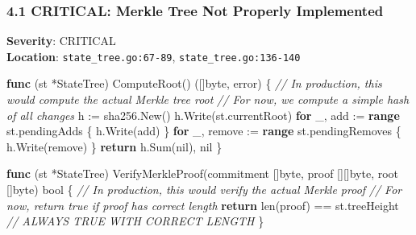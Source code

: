 \documentclass[
]{article}
\newenvironment{Shaded}{}{}
\newcommand{\BuiltInTok}[1]{\textcolor[rgb]{0.00,0.50,0.00}{#1}}
\newcommand{\CommentTok}[1]{\textcolor[rgb]{0.38,0.63,0.69}{\textit{#1}}}
\newcommand{\ControlFlowTok}[1]{\textcolor[rgb]{0.00,0.44,0.13}{\textbf{#1}}}
\newcommand{\DataTypeTok}[1]{\textcolor[rgb]{0.56,0.13,0.00}{#1}}
\newcommand{\KeywordTok}[1]{\textcolor[rgb]{0.00,0.44,0.13}{\textbf{#1}}}
\newcommand{\NormalTok}[1]{#1}
\newcommand{\OperatorTok}[1]{\textcolor[rgb]{0.40,0.40,0.40}{#1}}
\newcommand{\OtherTok}[1]{\textcolor[rgb]{0.00,0.44,0.13}{#1}}
\begin{document}
\subsubsection{4.1 CRITICAL: Merkle Tree Not Properly
Implemented}\label{41-critical-merkle-tree-not-properly-implemented}

\textbf{Severity}: CRITICAL\\
\textbf{Location}: \texttt{state\_tree.go:67-89},
\texttt{state\_tree.go:136-140}

\begin{Shaded}
\begin{Highlighting}[]
\KeywordTok{func} \OperatorTok{(}\NormalTok{st }\OperatorTok{*}\NormalTok{StateTree}\OperatorTok{)}\NormalTok{ ComputeRoot}\OperatorTok{()} \OperatorTok{([]}\DataTypeTok{byte}\OperatorTok{,} \DataTypeTok{error}\OperatorTok{)} \OperatorTok{\{}
    \CommentTok{// In production, this would compute the actual Merkle tree root}
    \CommentTok{// For now, we compute a simple hash of all changes}
\NormalTok{    h }\OperatorTok{:=}\NormalTok{ sha256}\OperatorTok{.}\NormalTok{New}\OperatorTok{()}
\NormalTok{    h}\OperatorTok{.}\NormalTok{Write}\OperatorTok{(}\NormalTok{st}\OperatorTok{.}\NormalTok{currentRoot}\OperatorTok{)}
    \ControlFlowTok{for}\NormalTok{ \_}\OperatorTok{,}\NormalTok{ add }\OperatorTok{:=} \KeywordTok{range}\NormalTok{ st}\OperatorTok{.}\NormalTok{pendingAdds }\OperatorTok{\{}
\NormalTok{        h}\OperatorTok{.}\NormalTok{Write}\OperatorTok{(}\NormalTok{add}\OperatorTok{)}
    \OperatorTok{\}}
    \ControlFlowTok{for}\NormalTok{ \_}\OperatorTok{,}\NormalTok{ remove }\OperatorTok{:=} \KeywordTok{range}\NormalTok{ st}\OperatorTok{.}\NormalTok{pendingRemoves }\OperatorTok{\{}
\NormalTok{        h}\OperatorTok{.}\NormalTok{Write}\OperatorTok{(}\NormalTok{remove}\OperatorTok{)}
    \OperatorTok{\}}
    \ControlFlowTok{return}\NormalTok{ h}\OperatorTok{.}\NormalTok{Sum}\OperatorTok{(}\OtherTok{nil}\OperatorTok{),} \OtherTok{nil}
\OperatorTok{\}}

\KeywordTok{func} \OperatorTok{(}\NormalTok{st }\OperatorTok{*}\NormalTok{StateTree}\OperatorTok{)}\NormalTok{ VerifyMerkleProof}\OperatorTok{(}\NormalTok{commitment }\OperatorTok{[]}\DataTypeTok{byte}\OperatorTok{,}\NormalTok{ proof }\OperatorTok{[][]}\DataTypeTok{byte}\OperatorTok{,}\NormalTok{ root }\OperatorTok{[]}\DataTypeTok{byte}\OperatorTok{)} \DataTypeTok{bool} \OperatorTok{\{}
    \CommentTok{// In production, this would verify the actual Merkle proof}
    \CommentTok{// For now, return true if proof has correct length}
    \ControlFlowTok{return} \BuiltInTok{len}\OperatorTok{(}\NormalTok{proof}\OperatorTok{)} \OperatorTok{==}\NormalTok{ st}\OperatorTok{.}\NormalTok{treeHeight  }\CommentTok{// ALWAYS TRUE WITH CORRECT LENGTH}
\OperatorTok{\}}
\end{Highlighting}
\end{Shaded}
\end{document}
